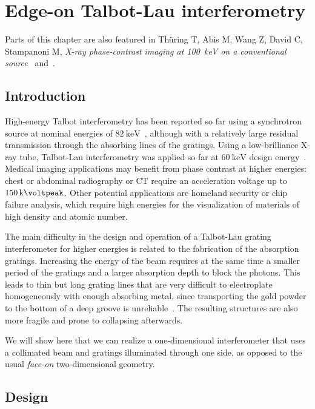 \chapter{Edge-on Talbot-Lau interferometry}\label{ch:edgeon} %
Parts of this chapter are also featured in Th\"uring T, Abis M, Wang Z,
David C, Stampanoni M, \emph{X-ray phase-contrast imaging at
    \SI{100}{\kilo\eV} on a conventional source}~\parencite{Thuering2014b}
    and~\parencite{20.500.11850/74467}.

\section{Introduction}
High-energy Talbot interferometry has been reported so far using a
synchrotron source at nominal energies of
$\SI{82}{\kilo\electronvolt}$~\parencite{Willner2013}, although with a relatively
large residual transmission through the absorbing lines of the gratings.
Using a low-brilliance X-ray tube, Talbot-Lau interferometry was applied so
far at $\SI{60}{\kilo\electronvolt}$ design energy~\parencite{Donath2009a}.
Medical imaging applications may benefit from phase contrast at higher
energies: chest or abdominal radiography or \ac{CT} require an acceleration
voltage up to $\SI{150}{\kilo\voltpeak}$. Other potential
applications are homeland security or chip failure analysis, which require
high energies for the visualization of materials of high density and atomic
number.

The main difficulty in the design and operation of a Talbot-Lau grating
interferometer for higher energies is related to the fabrication of the
absorption gratings. Increasing the energy of the beam requires at the same
time a smaller period of the gratings and a larger absorption depth to block
the photons. This leads to thin but long grating lines that are very
difficult to electroplate homogeneously with enough absorbing metal, since
transporting the gold powder to the bottom of a deep groove is
unreliable~\parencite{KAGIAS2018}.
The resulting structures are also more fragile and prone to collapsing
afterwards.

We will show here that we can realize a one-dimensional interferometer that
uses a collimated beam and gratings illuminated through one side, as opposed
to the usual \emph{face-on} two-dimensional geometry.

\section{Design}
